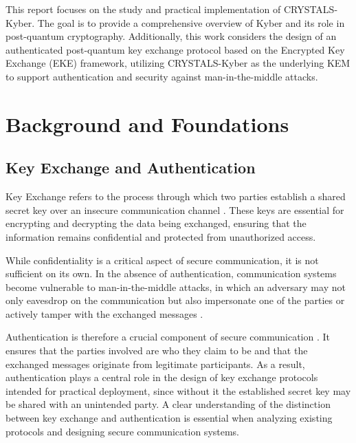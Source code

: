 \documentclass[12pt]{article}
\begin{document}
This report focuses on the study and practical implementation of CRYSTALS-Kyber. The goal is to provide a comprehensive overview of Kyber and its role in post-quantum cryptography. Additionally, this work considers the design of an authenticated post-quantum key exchange protocol based on the Encrypted Key Exchange (EKE) framework, utilizing CRYSTALS-Kyber as the underlying KEM to support authentication and security against man-in-the-middle attacks.

\newpage

\section {Background and Foundations}


\subsection{Key Exchange and Authentication}

Key Exchange refers to the process through which two parties establish a shared secret key over an insecure communication channel \cite{neke1996}. These keys are essential for encrypting and decrypting the data being exchanged, ensuring that the information remains confidential and protected from unauthorized access. 

While confidentiality is a critical aspect of secure communication, it is not sufficient on its own. In the absence of authentication, communication systems become vulnerable to man-in-the-middle attacks, in which an adversary may not only eavesdrop on the communication but also impersonate one of the parties or actively tamper with the exchanged messages \cite{neke1996}.

Authentication is therefore a crucial component of secure communication \cite{neke1996}. It ensures that the parties involved are who they claim to be and that the exchanged messages originate from legitimate participants. As a result, authentication plays a central role in the design of key exchange protocols intended for practical deployment, since without it the established secret key may be shared with an unintended party. A clear understanding of the distinction between key exchange and authentication is essential when analyzing existing protocols and designing secure communication systems.
\end{document}

